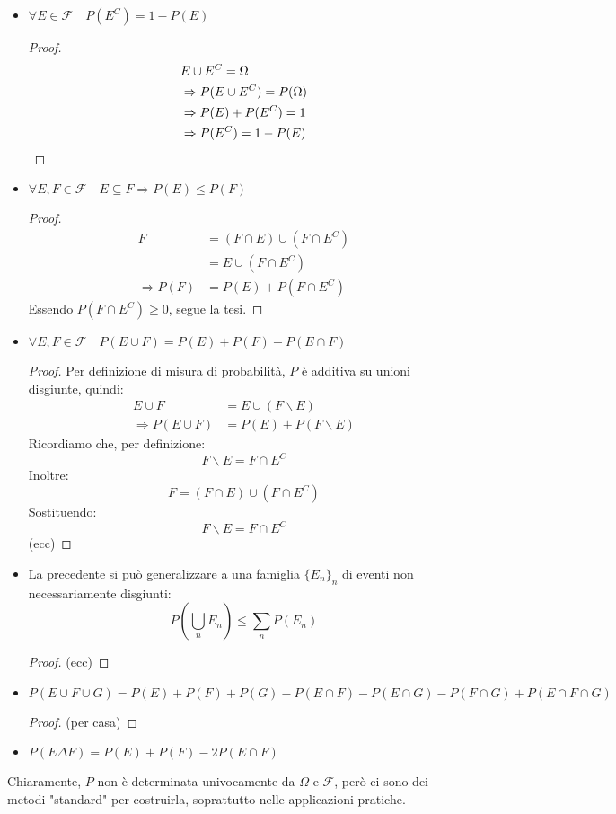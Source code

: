 \documentclass{article}
\theoremstyle{plain}
\theoremstyle{definition}
\theoremstyle{remark}
\begin{document}
\begin{itemize}
	\item $\forall E\in\mathscr{F}\quad P(E^C)=1-P(E)$
	\begin{proof}
		\begin{align*}
			&E\cup E^C=\Omega\\
			&\Rightarrow P(E\cup E^C)=P(\Omega)\\
			&\Rightarrow P(E)+P(E^C)=1\\
			&\Rightarrow P(E^C)=1-P(E)\qedhere
		\end{align*}
	\end{proof}
	\item $\forall E,F\in\mathscr{F}\quad E\subseteq F\Rightarrow P(E)\leq P(F)$
	\begin{proof}
		\begin{align*}
			F&=(F\cap E)\cup(F\cap E^C)\\
			&=E\cup(F\cap E^C)\\
			\Rightarrow P(F)&=P(E)+P(F\cap E^C)
		\end{align*}
		Essendo $P(F\cap E^C)\geq0$, segue la tesi.
	\end{proof}
	\item $\forall E,F\in\mathscr{F}\quad P(E\cup F)=P(E)+P(F)-P(E\cap F)$
	\begin{proof}
		Per definizione di misura di probabilità, $P$ è additiva su unioni disgiunte, quindi:
		\begin{align*}
			E\cup F&=E\cup (F\smallsetminus E)\\
			\Rightarrow P(E\cup F)&=P(E)+P(F\smallsetminus E)
		\end{align*}
		Ricordiamo che, per definizione:
		\begin{equation*}
			F\smallsetminus E=F\cap E^C
		\end{equation*}
		Inoltre:
		\begin{equation*}
			F=(F\cap E)\cup(F\cap E^C)
		\end{equation*}
		Sostituendo:
		\begin{equation*}
			F\smallsetminus E=F\cap E^C
		\end{equation*}
		(ecc)%
	\end{proof}
	\item La precedente si può generalizzare a una famiglia $\{E_n\}_n$ di eventi non necessariamente disgiunti:
	\begin{equation*}
		P(\bigcup_n E_n)\leq \sum_n P(E_n)
	\end{equation*}
	\begin{proof}
		(ecc)
	\end{proof}
	\item $P(E\cup F\cup G)=P(E)+P(F)+P(G)-P(E\cap F)-P(E\cap G)-P(F\cap G)+P(E\cap F\cap G)$
	\begin{proof}
		(per casa)
	\end{proof}
	\item $P(E\Delta F)=P(E)+P(F)-2P(E\cap F)$
\end{itemize}
Chiaramente, $P$ non è determinata univocamente da $\Omega$ e $\mathscr{F}$, però ci sono dei metodi "standard" per costruirla, soprattutto nelle applicazioni pratiche.
\end{document}
